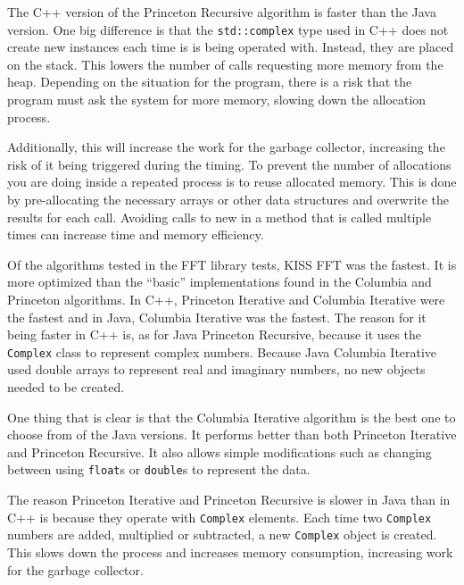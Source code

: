 The C++ version of the Princeton Recursive algorithm is faster than the Java version. One big difference is that the \texttt{std::complex} type used in C++ does not create new instances each time is is being operated with. Instead, they are placed on the stack. This lowers the number of calls requesting more memory from the heap. Depending on the situation for the program, there is a risk that the program must ask the system for more memory, slowing down the allocation process.

Additionally, this will increase the work for the garbage collector, increasing the risk of it being triggered during the timing. To prevent the number of allocations you are doing inside a repeated process is to reuse allocated memory. This is done by pre-allocating the necessary arrays or other data structures and overwrite the results for each call. Avoiding calls to new in a method that is called multiple times can increase time and memory efficiency.

Of the algorithms tested in the FFT library tests, KISS FFT was the fastest. It is more optimized than the \enquote{basic} implementations found in the Columbia and Princeton algorithms. In C++, Princeton Iterative and Columbia Iterative were the fastest and in Java, Columbia Iterative was the fastest. The reason for it being faster in C++ is, as for Java Princeton Recursive, because it uses the \texttt{Complex} class to represent complex numbers. Because Java Columbia Iterative used double arrays to represent real and imaginary numbers, no new objects needed to be created.



One thing that is clear is that the Columbia Iterative algorithm is the best one to choose from of the Java versions. It performs better than both Princeton Iterative and Princeton Recursive. It also allows simple modifications such as changing between using \texttt{float}s or  \texttt{double}s to represent the data.

The reason Princeton Iterative and Princeton Recursive is slower in Java than in C++ is because they operate with \texttt{Complex} elements. Each time two \texttt{Complex} numbers are added, multiplied or subtracted, a new \texttt{Complex} object is created. This slows down the process and increases memory consumption, increasing work for the garbage collector.

